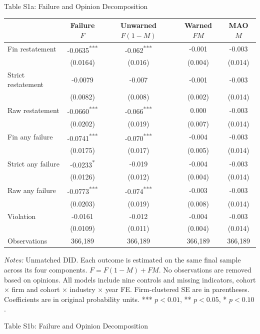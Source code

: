 \documentclass[10pt]{article}
\newcommand{\sym}[1]{\textsuperscript{#1}}
\begin{document}
\fontsize{10}{12}\selectfont
\setlength{\tabcolsep}{4pt}
\renewcommand{\arraystretch}{1.15}
\begin{center}\large Table S1a: Failure and Opinion Decomposition\end{center}
\begin{tabular*}{\textwidth}{@{\extracolsep{\fill}}lcccc@{}}
\toprule
 & Failure $F$ & Unwarned $F(1-M)$ & Warned $FM$ & MAO $M$ \\
\midrule
Fin restatement & -0.0635\sym{***} & -0.062\sym{***} & -0.001 & -0.003 \\
 & (0.0164) & (0.016) & (0.004) & (0.014) \\
Strict restatement & -0.0079 & -0.007 & -0.001 & -0.003 \\
 & (0.0082) & (0.008) & (0.002) & (0.014) \\
Raw restatement & -0.0660\sym{***} & -0.066\sym{***} & 0.000 & -0.003 \\
 & (0.0202) & (0.019) & (0.007) & (0.014) \\
Fin any failure & -0.0741\sym{***} & -0.070\sym{***} & -0.004 & -0.003 \\
 & (0.0175) & (0.017) & (0.005) & (0.014) \\
Strict any failure & -0.0233\sym{*} & -0.019 & -0.004 & -0.003 \\
 & (0.0126) & (0.012) & (0.004) & (0.014) \\
Raw any failure & -0.0773\sym{***} & -0.074\sym{***} & -0.003 & -0.003 \\
 & (0.0203) & (0.019) & (0.008) & (0.014) \\
Violation & -0.0161 & -0.012 & -0.004 & -0.003 \\
 & (0.0109) & (0.011) & (0.004) & (0.014) \\
\midrule
Observations & 366,189 & 366,189 & 366,189 & 366,189 \\
\bottomrule\end{tabular*}
\medskip\par\fontsize{9}{11}\selectfont
\textit{Notes:} Unmatched DID. Each outcome is estimated on the same final sample across its four components. $F=F(1-M)+FM$. No observations are removed based on opinions. All models include nine controls and missing indicators, cohort $\times$ firm and cohort $\times$ industry $\times$ year FE. Firm-clustered SE are in parentheses. Coefficients are in original probability units. *** $p<0.01$, ** $p<0.05$, * $p<0.10$.
\par\fontsize{10}{12}\selectfont
\clearpage
\begin{center}\large Table S1b: Failure and Opinion Decomposition\end{center}
\end{document}
